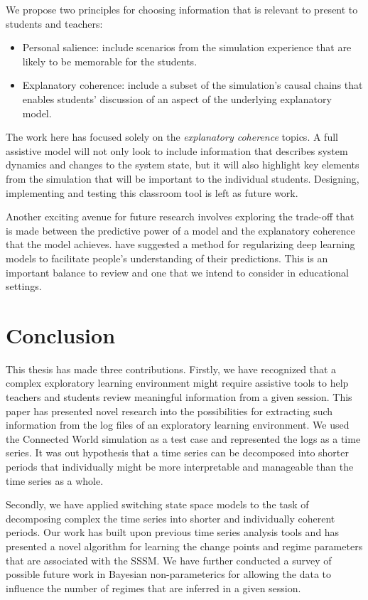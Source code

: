 We propose two principles for choosing information that is relevant to present to students and teachers:
\begin{itemize}
  \item Personal salience: include scenarios from the simulation experience that are likely to be memorable for the students.
  \item Explanatory coherence: include a subset of the simulation’s causal chains that enables students’ discussion of an aspect of the underlying explanatory model.
\end{itemize}

The work here has focused solely on the \textit{explanatory coherence} topics. A full assistive model will not only look to include information that describes system dynamics and changes to the system state, but it will also highlight key elements from the simulation that will be important to the individual students. Designing, implementing and testing this classroom tool is left as future work.

Another exciting avenue for future research involves exploring the trade-off that is made between the predictive power of a model and the explanatory coherence that the model achieves. \cite{wu2017beyond} have suggested a method for regularizing deep learning models to facilitate people's understanding of their predictions. This is an important balance to review and one that we intend to consider in educational settings.

\section{Conclusion}

This thesis has made three contributions. Firstly, we have recognized that a complex exploratory learning environment might require assistive tools to help teachers and students review meaningful information from a given session. This paper has presented novel research into the possibilities for extracting such information from the log files of an exploratory learning environment. We used the Connected World simulation as a test case and represented the logs as a time series. It was out hypothesis that a time series can be decomposed into shorter periods that individually might be more interpretable and manageable than the time series as a whole.

Secondly, we have applied switching state space models to the task of decomposing complex the time series into shorter and individually coherent periods. Our work has built upon previous time series analysis tools and has presented a novel algorithm for learning the change points and regime parameters that are associated with the SSSM. We have further conducted a survey of possible future work in Bayesian non-parameterics for allowing the data to influence the number of regimes that are inferred in a given session.

